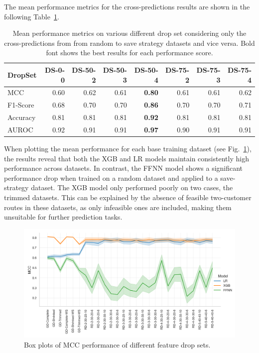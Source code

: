 The mean performance metrics for the cross-predictions results are shown in the following Table~\ref{tab:featurePerformance_OnlyCrossCorrelation}.
\begin{table}[ht]
	\centering
	\begin{tabular}{lrrrrrrr}
		\toprule
		DropSet  & DS-0-0 & DS-50-2 & DS-50-3 & DS-50-4       & DS-75-2 & DS-75-3 & DS-75-4 \\
		\midrule
		MCC      & 0.60   & 0.62    & 0.61    & \textbf{0.80} & 0.61    & 0.61    & 0.62    \\
		F1-Score & 0.68   & 0.70    & 0.70    & \textbf{0.86} & 0.70    & 0.70    & 0.71    \\
		Accuracy & 0.81   & 0.81    & 0.81    & \textbf{0.92} & 0.81    & 0.81    & 0.81    \\
		AUROC    & 0.92   & 0.91    & 0.91    & \textbf{0.97} & 0.90    & 0.91    & 0.91    \\
		\bottomrule
	\end{tabular}
	\caption[Mean performance metrics on various different drop set considering only the cross-predictions from random to save strategy datasets and vice versa.]
	{Mean performance metrics on various different drop set considering only the cross-predictions from from random to save strategy datasets and vice versa.
		Bold font shows the best results for each performance score.}
	\label{tab:featurePerformance_OnlyCrossCorrelation}
\end{table}
When plotting the mean performance for each base training dataset (see Fig.~\ref{fig:mcc_filter_results_lineplot}),
the results reveal that both the XGB and LR models maintain consistently high performance across datasets. In contrast,
the FFNN model shows a significant performance drop when trained on a random dataset and applied to a save-strategy dataset.
The XGB model only performed poorly on two cases, the trimmed datasets. This can be explained by the absence of feasible
two-customer routes in these datasets, as only infeasible ones are included, making them unsuitable for further prediction tasks.
\begin{figure}[ht]
	\centering
	\includegraphics[width = .95\textwidth]{pictures/feature_filter/cross_performance_lineplot.png}
	\caption{Box plots of MCC performance of different feature drop sets.}
	\label{fig:mcc_filter_results_lineplot}
\end{figure}%
